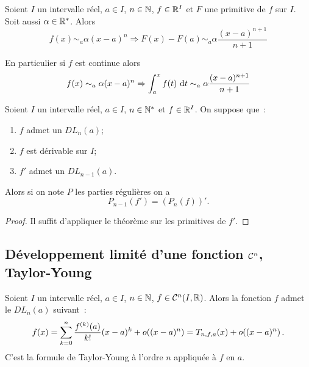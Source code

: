 \begin{corth}
  Soient \(I\) un intervalle réel, \(a \in I\), \(n \in \mathbb{N}\), \(f \in \mathbb{R}^I\) et 
  \(F\) une primitive de \(f\) sur \(I\). Soit aussi \(\alpha \in \mathbb{R}^{*}\). 
  Alors
  \begin{equation}
    f(x) \sim_a \alpha(x-a)^n \Rightarrow F(x)-F(a) \sim_a \alpha 
    \frac{(x-a)^{n+1}}{n+1}
  \end{equation}

  En particulier si \(f\) est continue alors
  \begin{equation}
    f(x) \sim_a \alpha(x-a)^n \Rightarrow \int_a^x f(t)\,\mathop{}\mathopen{}\mathrm{d} t \sim_a \alpha 
    \frac{(x-a)^{n+1}}{n+1}
  \end{equation}
\end{corth}

\begin{prop}
  Soient \(I\) un intervalle réel, \(a \in I\), \(n \in \mathbb{N}^*\) et \(f \in 
  \mathbb{R}^I\). On suppose que~:
  \begin{enumerate}
    \item \(f\) admet un \(DL_n(a)\);
    \item \(f\) est dérivable sur \(I\);
    \item \(f'\) admet un \(DL_{n-1}(a)\).
  \end{enumerate}
  Alors si on note \(P\) les parties régulières on a
  \begin{equation}
    P_{n-1}(f') = (P_n(f))'.
  \end{equation}
\end{prop}
\begin{proof}
  Il suffit d'appliquer le théorème sur les primitives de \(f'\).
\end{proof}

\subsection[Développement limité d'une fonction \(\classe{n}\)]{Développement 
limité d'une fonction \(\classe{n}\), Taylor-Young}

\begin{theo}
  Soient \(I\) un intervalle réel, \(a \in I\), \(n \in \mathbb{N}\), \(f \in 
  \mathcal{C}^{n}(I,\mathbb{R})\). Alors la fonction \(f\) admet le \(DL_n(a)\) suivant~:
  \begin{equation}
    f(x) = \sum_{k = 0}^n \frac{f^{(k)}(a)}{k!} (x-a)^k + o\mathopen{}\left((x-a)^n\right) = 
    T_{n,f,a}(x)+o\mathopen{}\left((x-a)^n\right).
  \end{equation}
  C'est la formule de Taylor-Young à l'ordre \(n\) appliquée à \(f\) en \(a\).
\end{theo}

